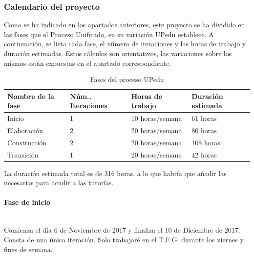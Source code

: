 \documentclass[twoside]{report}
\begin{document}
\subsubsection{Calendario del proyecto}

Como se ha indicado en los apartados anteriores, este proyecto se ha dividido en las fases que el Proceso Unificado, en su variación UPedu\cite{upedu} establece. A continuación, se lista cada fase, el número de iteraciones y las horas de trabajo y duración estimadas. Estos cálculos son orientativos, las variaciones sobre los mismos están expuestas en el apartado correspondiente.

\begin{table}[H]
\centering
\begin{tabular}{|l|l|l|l|}
\hline
Nombre de la fase & Núm.. Iteraciones & Horas de trabajo & Duración estimada \\ \hline
Inicio            & 1                 & 10 horas/semana  & 61 horas       \\ \hline
Elaboración       & 2                 & 20 horas/semana  & 80 horas    \\ \hline
Construcción      & 2                 & 20 horas/semana  & 108 horas       \\ \hline
Transición        & 1                 & 20 horas/semana   & 42 horas       \\ \hline
\end{tabular}
\caption{Fases del proceso UPedu}
\end{table}

La duración estimada total es de 316 horas, a lo que habría que añadir las necesarias para acudir a las tutorías.

\paragraph{Fase de inicio}\mbox{}\\

Comienza el día 6 de Noviembre de 2017 y finaliza el 10 de Diciembre de 2017. Consta de una única iteración. Solo trabajaré en el T.F.G. durante los viernes y fines de semana.
\end{document}
